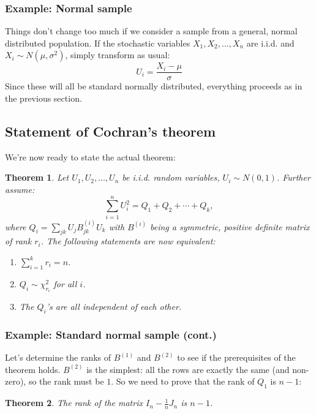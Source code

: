 \documentclass[12pt, a4paper]{article}
\newtheorem{theorem}{Theorem}
\begin{document}
\subsubsection{Example: Normal sample}
Things don't change too much if we consider a sample from a general, normal distributed population. If the stochastic variables $X_1, X_2, \ldots, X_n$ are i.i.d. and $X_i\sim N(\mu,\sigma^2)$, simply transform as usual:
\begin{equation}
U_i=\frac{X_i-\mu}{\sigma}
\end{equation}
Since these will all be standard normally distributed, everything proceeds as in the previous section.

\subsection{Statement of Cochran's theorem}
We're now ready to state the actual theorem:
\begin{theorem}
\label{cochran}
Let $U_1, U_2, \ldots , U_n$ be i.i.d. random variables, $U_i\sim N(0,1)$. Further assume:
\begin{equation}
\sum_{i=1}^n U_i^2 = Q_1 + Q_2 + \cdots + Q_k,
\end{equation}
where $Q_i=\sum_{jk}U_j B^{(i)}_{jk}U_k$ with $B^{(i)}$ being a symmetric, positive definite matrix of rank $r_i$. The following statements are now equivalent:
\begin{enumerate}
\item $\sum_{i=1}^k r_i=n$.
\item $Q_i\sim\chi^2_{r_i}$ for all $i$.
\item The $Q_i$'s are all independent of each other.
\end{enumerate}
\end{theorem}

\subsubsection{Example: Standard normal sample (cont.)}
Let's determine the ranks of $B^{(1)}$ and $B^{(2)}$ to see if the prerequisites of the theorem holds. $B^{(2)}$ is the simplest: all the rows are exactly the same (and non-zero), so the rank must be $1$. So we need to prove that the rank of $Q_1$ is $n-1$:
\begin{theorem}
The rank of the matrix $I_n-\frac{1}{n}J_n$ is $n-1$.
\end{theorem}
\end{document}
